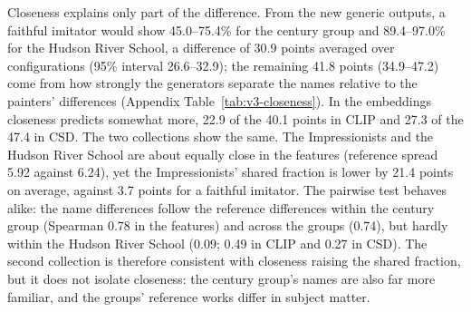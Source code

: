 \documentclass[10pt]{article}
\begin{document}
Closeness explains only part of the difference. From the new generic outputs, a faithful imitator
would show 45.0--75.4\% for the century group and 89.4--97.0\% for the Hudson River School, a
difference of 30.9 points averaged over configurations (95\% interval 26.6--32.9); the remaining
41.8 points (34.9--47.2) come from how strongly the generators separate the names relative to the
painters' differences (Appendix Table~\ref{tab:v3-closeness}). In the embeddings closeness predicts
somewhat more, 22.9 of the 40.1 points in CLIP and 27.3 of the 47.4 in CSD. The two collections
show the same. The Impressionists and the Hudson River School are about equally close in the
features (reference spread 5.92 against 6.24), yet the Impressionists' shared fraction is lower by
21.4 points on average, against 3.7 points for a faithful imitator. The pairwise test behaves
alike: the name differences follow the reference differences within the century group (Spearman
0.78 in the features) and across the groups (0.74), but hardly within the Hudson River School (0.09;
0.49 in CLIP and 0.27 in CSD). The second collection is therefore consistent with closeness raising
the shared fraction, but it does not isolate closeness: the century group's names are also far more
familiar, and the groups' reference works differ in subject matter.
\end{document}
